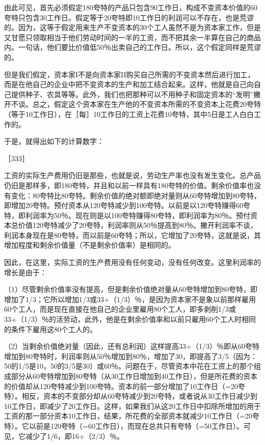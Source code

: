 由此可见，首先必须假定180夸特的产品只包含90工作日，构成不变资本价值的60夸特只包含30工作日。假定等于20夸特即10工作日的利润可以不存在，也是荒谬的。因为，这等于假定用来生产不变资本的30个工人虽然不是为资本家工作，但是又甘愿只领取相当于他们劳动时间的一半的工资，而不把其余一半算在自己的商品内。一句话，他们要比价值低50％出卖自己的工作日。所以，这个假定同样是荒谬的。

但是我们假定，资本家I不是向资本家II购买自己所需的不变资本然后进行加工，而是在他自己的企业中把不变资本的生产和加工结合起来。这样，他就是自己向自己提供种子、农具等等。此外，我们也把那种可以不用种子和固定资本的“发明”撇开不谈。总之，假定这个资本家在生产他的不变资本所需的不变资本上花费20夸特（等于10工作日），在［每］10工作日的工资上花费10夸特，其中5日是工人白白工作的。

于是，就得出如下的计算数字：

［333］

\todo{}

工资的实际生产费用仍旧是那些，也就是说，劳动生产率也没有发生变化。总产品仍旧是那样多，即180夸特，并且和以前一样具有180夸特的价值。剩余价值率也没有变化：80夸特比80夸特。剩余价值的绝对额即绝对量则从60夸特增加到80夸特，即增加20夸特。预付资本从120夸特减少到100夸特。以前是以120夸特赚得60夸特，即利润率为50％。现在则是以100夸特赚得80夸特，即利润率为80％。预付资本总价值120夸特减少了20夸特，利润率则从50％提高到80％。撇开利润率不谈，利润本身现在是80夸特，而以前是60夸特；所以，它增加了20夸特，这就是说，其增加程度和剩余价值量（不是剩余价值率）是相同的。

因此，在这里，实际工资的生产费用没有任何变动，没有任何改变。这里利润率的增长是由于：

（1）尽管剩余价值率没有提高，但是剩余价值绝对量从60夸特增加到80夸特，即增加了1/3；它所以增加1/3或33+（1/3）％，是因为资本家不是象以前那样雇用60个工人，而是现在直接在他自己的企业里雇用80个工人，即多剥削1/3或33+（1/3）％的活劳动，此外，他是在剩余价值率和以前只雇用60个工人时相同的条件下雇用这80个工人的。

（2）当剩余价值绝对量（因此，还有总利润）这样提高33+（1/3）％即从60夸特增加到80夸特时，利润率则从50％增加到80％，增加了30，即提高了3/5（因为：50的1/5是10，50的3/5是30）或60％。问题在于，尽管资本中花在工资上的那个组成部分从60夸特增加到80夸特（从30工作日增加到40工作日），但是所花费的资本的价值却从120夸特减少到100夸特。资本的前一部分增加了10工作日（=20夸特）。相反，资本的不变部分却从60夸特减少到20夸特，或者说从30工作日减少到10工作日，即减少了20工作日。这样，如果我们从这20工作日中扣除所增加的用于工资的那一部分资本10工作日，结果，所花费的全部资本就减少10工作日（=20夸特）。它以前是120夸特（=60工作日），而现在总共只有夸特（=50工作日）。可见，它减少了1/6，即16+（2/3）％。

